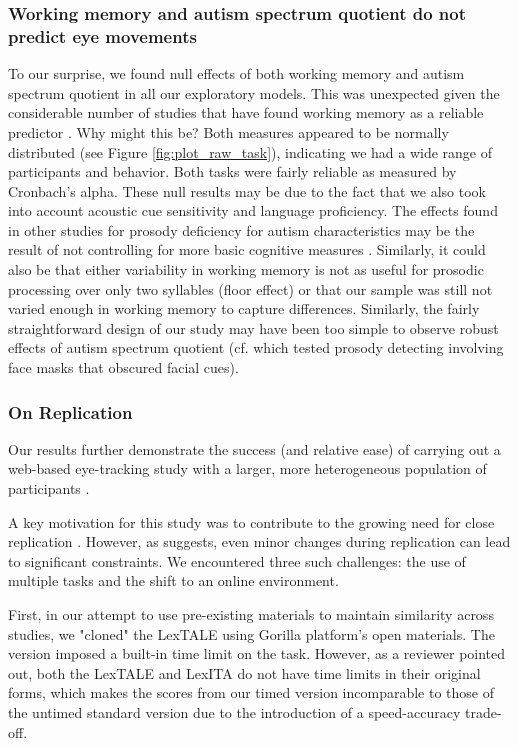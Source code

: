 \subsubsection{Working memory and autism spectrum quotient do not predict eye movements}
To our surprise, we found null effects of both working memory and autism spectrum quotient in all our exploratory models. This was unexpected given the considerable number of studies that have found working memory as a reliable predictor \citep{Traxler2009, Huettig2016}. Why might this be? Both measures appeared to be normally distributed (see Figure \ref{fig:plot_raw_task}), indicating we had a wide range of participants and behavior. Both tasks were fairly reliable as measured by Cronbach's alpha. These null results may be due to the fact that we also took into account acoustic cue sensitivity and language proficiency. The effects found in other studies for prosody deficiency for autism characteristics may be the result of not controlling for more basic cognitive measures \cite{grossman2023relationship, Liu2018}. Similarly, it could also be that either variability in working memory is not as useful for prosodic processing over only two syllables (floor effect) or that our sample was still not varied enough in working memory to capture differences. Similarly, the fairly straightforward design of our study may have been too simple to observe robust effects of autism spectrum quotient (cf. \cite{Sinagra2022} which tested prosody detecting involving face masks that obscured facial cues).



\subsubsection{On Replication}
Our results further demonstrate the success (and relative ease) of carrying out a web-based eye-tracking study with a larger, more heterogeneous population of participants \citep{Vos_2017, bramlett_wiener_24-AOW}.

A key motivation for this study was to contribute to the growing need for close replication \citep{Marsden_2018}. However, as \cite{mcmanus2022replication} suggests, even minor changes during replication can lead to significant constraints. We encountered three such challenges: the use of multiple tasks and the shift to an online environment.

First, in our attempt to use pre-existing materials to maintain similarity across studies, we "cloned" the LexTALE using Gorilla platform’s open materials. The version imposed a built-in time limit on the task. However, as a reviewer pointed out, both the LexTALE and LexITA do not have time limits in their original forms, which makes the scores from our timed version incomparable to those of the untimed standard version due to the introduction of a speed-accuracy trade-off.

